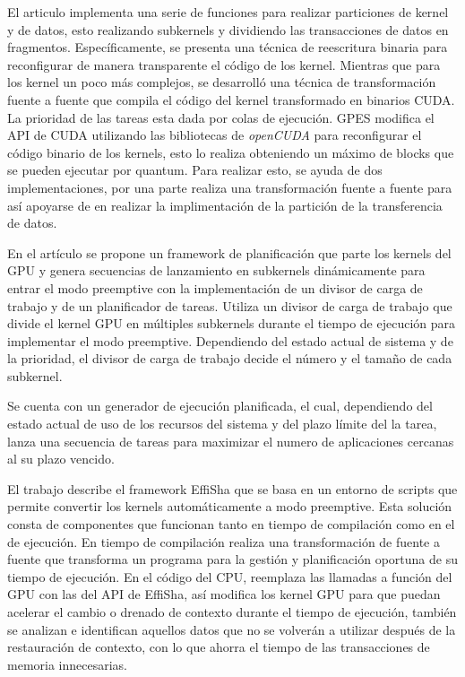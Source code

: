 El articulo \cite{GPES} implementa una serie de funciones para realizar particiones de kernel y de datos, esto realizando subkernels y dividiendo las transacciones de datos en fragmentos. 
Específicamente, se presenta una técnica de reescritura binaria para reconfigurar de manera transparente el código de los kernel. Mientras que para los kernel un poco más complejos, se desarrolló una técnica de transformación fuente a fuente que compila el código del kernel transformado en binarios CUDA. La prioridad de las tareas esta dada por colas de ejecución. GPES modifica el API de CUDA utilizando las bibliotecas de  \textit{openCUDA} para reconfigurar el código binario de los kernels, esto lo realiza obteniendo un máximo de blocks que se pueden ejecutar por quantum. Para realizar esto, se ayuda de dos implementaciones, por una parte realiza una transformación fuente a fuente para así apoyarse de en realizar la implimentación de la partición de la transferencia de datos.


En el artículo \cite{RTFG} se propone un framework de planificación que parte los kernels del GPU y genera secuencias de lanzamiento en subkernels dinámicamente para entrar el modo preemptive con la implementación de un divisor de carga de trabajo y de un planificador de tareas. Utiliza un divisor de carga de trabajo que divide el kernel GPU en múltiples subkernels durante el tiempo de ejecución para implementar el modo preemptive. Dependiendo del estado actual de sistema y de la prioridad, el divisor de carga de trabajo decide el número y el tamaño de cada subkernel. 

\vspace{0.3cm}

Se cuenta con un generador de ejecución planificada, el cual, dependiendo del estado actual de uso de los recursos del sistema y del plazo límite del la tarea, lanza una secuencia de tareas para maximizar el numero de aplicaciones cercanas al su plazo vencido.	

El trabajo \cite{Effisha} describe el framework EffiSha que se basa en un entorno de scripts que permite convertir los kernels automáticamente a modo preemptive. Esta solución consta de componentes que funcionan tanto en tiempo de compilación como en el de ejecución. En tiempo de compilación realiza una transformación de fuente a fuente que transforma un programa para la gestión y planificación oportuna de su tiempo de ejecución.
En el código del CPU, reemplaza las llamadas a función del GPU con las del API de EffiSha, así modifica los kernel GPU para que puedan acelerar el cambio o drenado de contexto durante el tiempo de ejecución, también se analizan e identifican aquellos datos que no se volverán a utilizar después de la restauración de contexto, con lo que ahorra el tiempo de las transacciones de memoria innecesarias.

